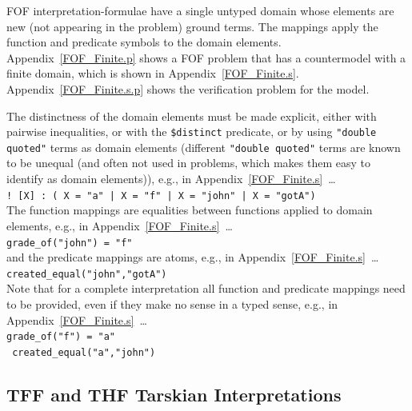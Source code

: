 \documentclass{easychair}
\newcommand{\smalltt}[1]{\small \texttt{#1}}
\begin{document}
FOF interpretation-formulae have a single untyped domain whose elements are new (not appearing 
in the problem) ground terms. 
The mappings apply the function and predicate symbols to the domain elements.
Appendix~\ref{FOF_Finite.p} shows a FOF problem that has a countermodel with a finite domain, 
which is shown in Appendix~\ref{FOF_Finite.s}.
Appendix~\ref{FOF_Finite.s.p} shows the verification problem for the model.

The distinctness of the domain elements must be made explicit, either with pairwise inequalities, 
or with the {\tt \$distinct} predicate, or by using {\tt "double quoted"} terms as domain 
elements (different {\tt "double quoted"} terms are known to be unequal (and often not used in 
problems, which makes them easy to identify as domain elements)), e.g., in 
Appendix~\ref{FOF_Finite.s}~\ldots \\
\hspace*{0.5cm}\smalltt{! [X] : ( X = "a" | X = "f" | X = "john" | X = "gotA")} \\
The function mappings are equalities between functions applied to domain elements, e.g., in 
Appendix~\ref{FOF_Finite.s}~\ldots \\
\hspace*{0.5cm}\smalltt{grade\_of("john") = "f"}\\
and the predicate mappings are atoms, e.g., in Appendix~\ref{FOF_Finite.s}~\ldots \\
\hspace*{0.5cm}\smalltt{created\_equal("john","gotA")}\\
Note that for a complete interpretation all function and predicate mappings need to be provided,
even if they make no sense in a typed sense, e.g., in Appendix~\ref{FOF_Finite.s}~\ldots \\
\hspace*{0.5cm}\smalltt{grade\_of("f") = "a"}\\
\hspace*{0.5cm}\smalltt{{\raisebox{0.4ex}{\texttildelow}} created\_equal("a","john")}


\subsection{TFF and THF Tarskian Interpretations}
\label{NewTarskianTFFTHF}
\end{document}
